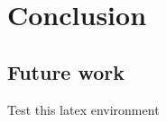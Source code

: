 \chapter{Conclusion}
\label{chap:conclusion}

\section{Future work}

\begin{futurework}
Test this latex environment
\end{futurework}